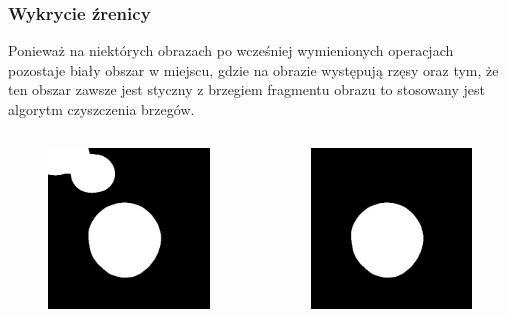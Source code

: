 \documentclass{beamer}
\begin{document}
\begin{frame}
\frametitle{Wykrycie źrenicy}
Ponieważ na niektórych obrazach po wcześniej wymienionych operacjach pozostaje biały obszar w miejscu, gdzie na obrazie występują rzęsy oraz tym, że ten obszar zawsze jest styczny z brzegiem fragmentu obrazu to stosowany jest algorytm czyszczenia brzegów.
\begin{columns}
		\begin{figure}
		\begin{center}
		\includegraphics[scale=0.25]{roi1.jpg}
		\end{center}
		\end{figure}
		\begin{figure}
		\begin{center}
		\includegraphics[scale=0.25]{roi2.jpg}
		\end{center}
		\end{figure}
\end{columns}
\end{frame}
\end{document}
